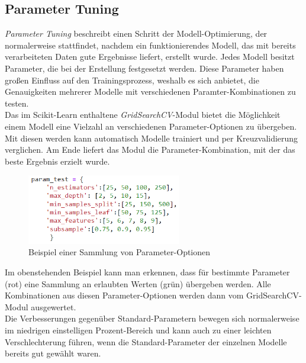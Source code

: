 \subsection{Parameter Tuning}
\textit{Parameter Tuning} beschreibt einen Schritt der Modell-Optimierung, der normalerweise stattfindet, 
nachdem ein funktionierendes Modell, das mit bereits verarbeiteten Daten gute Ergebnisse liefert, erstellt 
wurde. Jedes Modell besitzt Parameter, die bei der Erstellung festgesetzt werden. Diese Parameter haben 
großen Einfluss auf den Trainingsprozess, weshalb es sich anbietet, die Genauigkeiten mehrerer Modelle 
mit verschiedenen Paramter-Kombinationen zu testen.\\
Das im Scikit-Learn enthaltene \textit{GridSearchCV}-Modul
bietet die Möglichkeit einem Modell eine Vielzahl an verschiedenen Parameter-Optionen zu übergeben. Mit diesen 
werden kann automatisch Modelle trainiert und per Kreuzvalidierung verglichen. Am Ende liefert das Modul 
die Parameter-Kombination, mit der das beste Ergebnis erzielt wurde.

\begin{figure}[h]
    \centering
    \includegraphics[width=0.6\textwidth]{pic/param_test.png}
    \caption{Beispiel einer Sammlung von Parameter-Optionen}
    \label{fig:CV}
\end{figure}

Im obenstehenden Beispiel kann man erkennen, dass für bestimmte Parameter (rot) eine Sammlung an erlaubten 
Werten (grün) übergeben werden. Alle Kombinationen aus diesen Parameter-Optionen werden dann vom 
GridSearchCV-Modul ausgewertet.\\
Die Verbesserungen gegenüber Standard-Parametern bewegen sich normalerweise im niedrigen einstelligen 
Prozent-Bereich und kann auch zu einer leichten Verschlechterung führen, wenn die Standard-Parameter
der einzelnen Modelle bereits gut gewählt waren.

